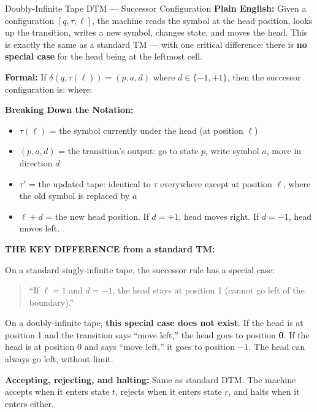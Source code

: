 \begin{definitionbox}{{Doubly-Infinite Tape DTM --- Successor Configuration}}
\textbf{Plain English:}
Given a configuration $[q, \tau, \ell]$, the machine reads the symbol at the
head position, looks up the transition, writes a new symbol, changes state,
and moves the head. This is exactly the same as a standard TM --- with one
critical difference: there is \textbf{no special case} for the head being at
the leftmost cell.

\textbf{Formal:}
If $\delta(q, \tau(\ell)) = (p, a, d)$ where $d \in \{-1, +1\}$, then the
successor configuration is:
where:

\textbf{Breaking Down the Notation:}
\begin{itemize}[nosep]
\item $\tau(\ell)$ = the symbol currently under the head (at position $\ell$)
\item $(p, a, d)$ = the transition's output: go to state $p$, write symbol
  $a$, move in direction $d$
\item $\tau'$ = the updated tape: identical to $\tau$ everywhere except at
  position $\ell$, where the old symbol is replaced by $a$
\item $\ell + d$ = the new head position. If $d = +1$, head moves right. If
  $d = -1$, head moves left.
\end{itemize}

\textbf{THE KEY DIFFERENCE from a standard TM:}

On a standard singly-infinite tape, the successor rule has a special case:
\begin{quote}
``If $\ell = 1$ and $d = -1$, the head stays at position 1 (cannot go left
of the boundary).''
\end{quote}

On a doubly-infinite tape, \textbf{this special case does not exist}. If the
head is at position 1 and the transition says ``move left,'' the head goes to
position \textbf{0}. If the head is at position 0 and says ``move left,'' it
goes to position $-1$. The head can always go left, without limit.

\textbf{Accepting, rejecting, and halting:} Same as standard DTM. The machine
accepts when it enters state $t$, rejects when it enters state $r$, and halts
when it enters either.
\end{definitionbox}

